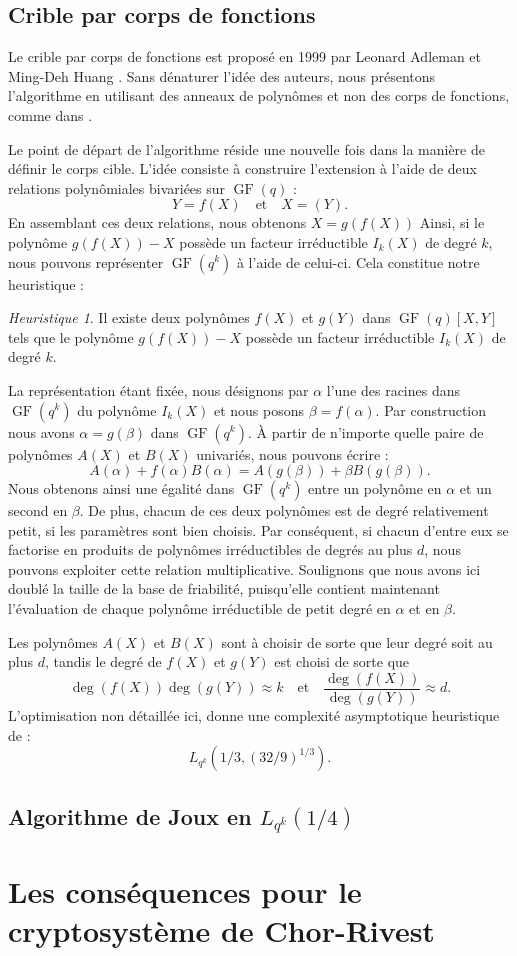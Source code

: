 \documentclass[a4paper, titlepage, 11pt]{article}
\theoremstyle{definition}
\theoremstyle{remark}
\newtheorem{heur}[theo]{Heuristique}
\def\gf{\operatorname{GF}}
\begin{document}
\subsection{Crible par corps de fonctions}

Le crible par corps de fonctions est proposé en 1999 par Leonard Adleman et Ming-Deh Huang \cite{adleman1999}. Sans dénaturer l'idée des auteurs, nous présentons l'algorithme en utilisant des anneaux de polynômes et non des corps de fonctions, comme dans \cite{joux2013, joux2006, pierrot2016}.

Le point de départ de l'algorithme réside une nouvelle fois dans la manière de définir le corps cible. L'idée consiste à construire l'extension à l'aide de deux relations polynômiales bivariées sur $\gf(q)$ : $$Y = f(X) \quad \text{et}\quad X = (Y).$$
En assemblant ces deux relations, nous obtenons $X = g(f(X))$ Ainsi, si le polynôme $g(f(X)) - X$ possède un facteur irréductible $I_k(X)$ de degré $k$, nous pouvons représenter $\gf(q^k)$ à l'aide de celui-ci. Cela constitue notre heuristique :
\begin{heur}
Il existe deux polynômes $f(X)$ et $g(Y)$ dans $\gf(q)[X, Y]$ tels que le polynôme $g(f(X)) - X$ possède un facteur irréductible $I_k(X)$ de degré $k$.
\end{heur}
La représentation étant fixée, nous désignons par $\alpha$ l'une des racines dans $\gf(q^k)$ du polynôme $I_k(X)$ et nous posons $\beta = f(\alpha)$. Par construction nous avons $\alpha = g(\beta)$ dans $\gf(q^k)$. À partir de n'importe quelle paire de polynômes $A(X)$ et $B(X)$ univariés, nous pouvons écrire :
$$A(\alpha) + f(\alpha)B(\alpha) = A(g(\beta)) + \beta B(g(\beta)).$$
Nous obtenons ainsi une égalité dans $\gf(q^k)$ entre un polynôme en $\alpha$ et un second en $\beta$. De plus, chacun de ces deux polynômes est de degré relativement petit, si les paramètres sont bien choisis. Par conséquent, si chacun d'entre eux se factorise en produits de polynômes irréductibles de degrés au plus $d$, nous pouvons exploiter cette relation multiplicative. Soulignons que nous avons ici doublé la taille de la base de friabilité, puisqu'elle contient maintenant l'évaluation de chaque polynôme irréductible de petit degré en $\alpha$ et en $\beta$.

Les polynômes $A(X)$ et $B(X)$ sont à choisir de sorte que leur degré soit au plus $d$, tandis le degré de $f(X)$ et $g(Y)$ est choisi de sorte que $$\deg(f(X)) \deg(g(Y)) \approx k \quad\text{et}\quad \frac{\deg(f(X))}{\deg(g(Y))} \approx d.$$
L'optimisation non détaillée ici, donne une complexité asymptotique heuristique de :
$$L_{q^k}(1/3, (32/9)^{1/3}).$$

\subsection{Algorithme de Joux en $L_{q^k}(1/4)$}

\section{Les conséquences pour le cryptosystème de Chor-Rivest}\label{sec:consequences}

\newpage


\end{document}
